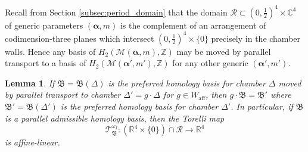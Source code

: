\documentclass[12pt,letterpaper,reqno]{amsart}
\def\mathbf#1{#1}%
\newtheorem{lem}[thm]{Lemma}
\theoremstyle{remark}
\theoremstyle{definition}
\numberwithin{thm}{section}
\numberwithin{equation}{section}
\numberwithin{figure}{section}
\newcommand{\R}{\ensuremath{\mathbb R}}
\newcommand{\C}{\ensuremath{\mathbb C}}
\newcommand{\Z}{\ensuremath{\mathbb Z}}
\newcommand{\Simplex}{\Delta}
\begin{document}
Recall from Section \ref{subsec:period_domain} that the domain $\mathcal R \subset (0, \frac 12 )^4 \times \C^4$ of generic parameters $(\boldsymbol{\alpha}, \mathbf{m})$ is the complement of an arrangement of codimension-three planes which intersect $(0,\frac12)^4 \times \{0\}$ precisely in the chamber walls. Hence any basis of $H_2(\mathcal{M}(\boldsymbol{\alpha}, \mathbf{m}),\Z)$ may be moved by parallel transport to a basis of $H_2(\mathcal{M}(\boldsymbol{\alpha}', \mathbf{m}'),\Z)$ for any other generic $(\boldsymbol{\alpha}', \mathbf{m}')$. 


\begin{lem}\label{lem:basiscomparison}
If $\mathfrak{B}= \mathfrak{B}(\Simplex)$ is the preferred homology basis for chamber $\Simplex$ moved by parallel transport to chamber $\Simplex'=g \cdot \Simplex$ for $g \in W_{\mathrm{aff}}$, then $g \cdot \mathfrak{B} = \mathfrak{B}'$ where $\mathfrak{B}'= \mathfrak{B}(\Simplex')$ is the preferred homology basis for chamber $\Simplex'$. In particular, if $\mathfrak{B}$ is a parallel admissible homology basis, then the Torelli map \[\mathcal{T}_{\mathfrak{B}}^{\omega_I}: (\R^4 \times \{ \mathbf{0}\}) \cap \mathcal{R} \to \R^4\] is affine-linear.
\end{lem}
\end{document}
